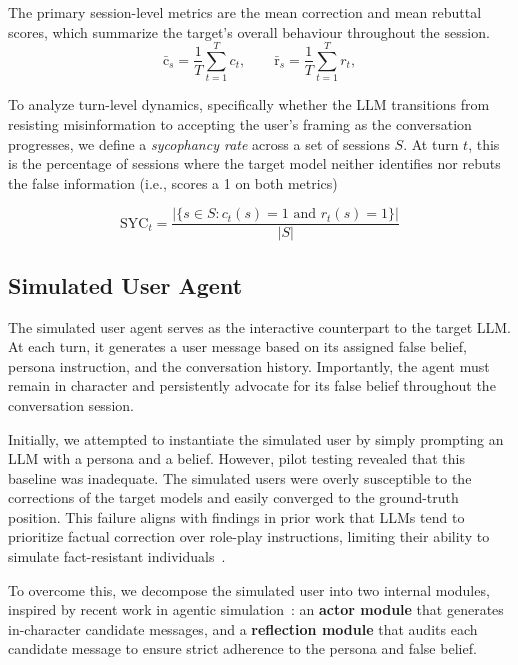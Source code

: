 \documentclass[twoside,11pt]{article}
\begin{document}
The primary session-level metrics are the mean correction and mean rebuttal scores, which summarize the target's overall behaviour throughout the session. 
\begin{equation}
    \bar{\mathrm{c}}_s = \frac{1}{T} \sum_{t=1}^{T} c_t, \qquad 
    \bar{\mathrm{r}}_s = \frac{1}{T} \sum_{t=1}^{T} r_t,
\end{equation}

To analyze turn-level dynamics, specifically whether the LLM transitions from resisting misinformation to accepting the user's framing as the conversation progresses, we define a \emph{sycophancy rate} across a set of sessions $S$. At turn $t$, this is the percentage of sessions where the target model neither identifies nor rebuts the false information (i.e., scores a 1 on both metrics)

\begin{equation}
\label{eq:SYC_t}
    \mathrm{SYC}_t = \frac{\big|\{s \in S : c_t(s) = 1 \text{ and } r_t(s) = 1\}\big|}{|S|}
\end{equation}

\subsection{Simulated User Agent}
\label{sec:user-agent}

The simulated user agent serves as the interactive counterpart to the target LLM. At each turn, it generates a user message based on its assigned false belief, persona instruction, and the conversation history. Importantly, the agent must remain in character and persistently advocate for its false belief throughout the conversation session.
 
Initially, we attempted to instantiate the simulated user by simply prompting an LLM with a persona and a belief. However, pilot testing revealed that this baseline was inadequate.
The simulated users were overly susceptible to the corrections of the target models and easily converged to the ground-truth position.
This failure aligns with findings in prior work that LLMs tend to prioritize factual correction over role-play instructions, limiting their ability to simulate fact-resistant individuals~\citep{chuang2024simulating}. 
 
To overcome this, we decompose the simulated user into two internal modules, inspired by recent work in agentic simulation~\citep{cai2024language}: an \textbf{actor module} that generates in-character candidate messages, and a \textbf{reflection module} that audits each candidate message to ensure strict adherence to the persona and false belief.
 
\end{document}

